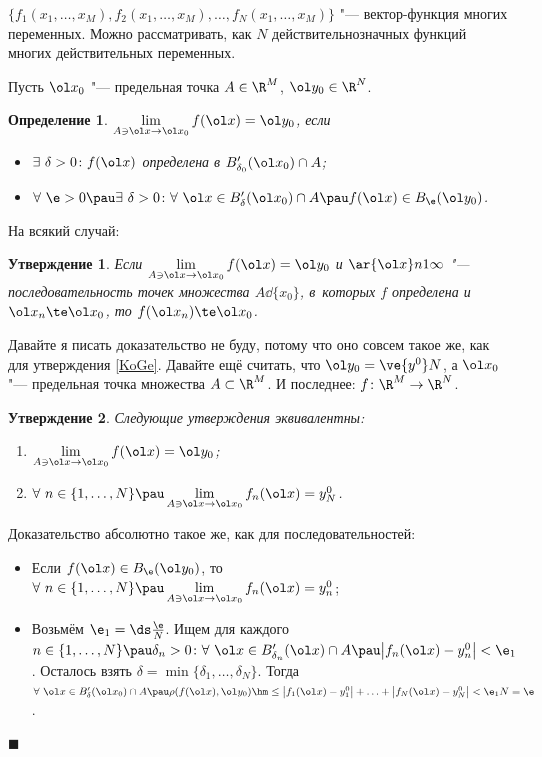 \documentclass[a4paper,10pt,twoside]{article}
\newtheorem{Def}{Определение}[section]
\newtheorem{Ut}{Утверждение}[section]
\newenvironment{Proof}
       {\par\noindent{\textbf{Доказательство.}}}
       {\hfill$\scriptstyle\blacksquare$}
\begin{document}
	 $\big\{f_1(x_1,\ldots,x_M),f_2(x_1,\ldots,x_M),\ldots,f_N(x_1,\ldots,x_M)\big\}$ "--- вектор-функция многих переменных. Можно рассматривать, как 
	 $N$ действительнозначных функций многих действительных переменных.
	 
	 Пусть $\ol x_0$ "--- предельная точка $A\in\R^M$, $\ol y_0\in\R^N$.
	 \begin{Def}
	 $\lim\limits_{A\ni\ol x\to \ol x_0}f(\ol x) = \ol y_0$, если
	 \begin{itemize}
	   \item [0)] $\exists\ \delta > 0\colon f(\ol x)$ определена в $B'_{\delta_0}(\ol x_0)\cap A$;
	   \item [1)] $\forall\ \e>0\pau \exists\ \delta >0 \colon \forall\ \ol x\in B'_\delta(\ol x_0)\cap A\pau f(\ol x)\in B_\e(\ol y_0)$.
	 \end{itemize}
	 \end{Def} 
	 На всякий случай:
	 \begin{Ut}
	 Если $\lim\limits_{A\ni \ol x\to \ol x_0}f(\ol x) = \ol y_0$ и $\ar {\ol x}n1\infty$ "--- последовательность точек множества $A\dd \{x_0\}$, в~которых
	 $f$ определена и $\ol x_n \te \ol x_0$, то $f(\ol x_n)\te \ol x_0$.
	 \end{Ut}
	 Давайте я писать доказательство не буду, потому что оно совсем такое же, как для утверждения \ref{KoGe}.
	 Давайте ещё считать, что $\ol y_0 = \ve {y^0}N$, а $\ol x_0$ "--- предельная точка множества $A\subset \R^M$. И последнее: 
	 $f\colon \R^M\to \R^N$.
	 \begin{Ut}
	 Следующие утверждения эквивалентны:
	 \begin{enumerate}
	   \item $\lim\limits_{A\ni\ol x\to\ol x_0}f(\ol x) = \ol y_0$;
	   \item $\forall \ n\in\{1,\ldots,N\}\pau \lim\limits_{A\ni \ol x\to \ol x_0}f_n(\ol x) = y_N^0$.
	 \end{enumerate}
	 \end{Ut}
	 \begin{Proof}
	 Доказательство абсолютно такое же, как для последовательностей:
	 \begin{itemize}
	   \item [$\imp$] Если $f(\ol x)\in B_\e(\ol y_0)$, то $\forall\ n\in\{1,\ldots, N\}\pau \lim\limits_{A\ni \ol x\to \ol x_0}f_n(\ol x) = y_n^0$;
	   \item [$\Leftarrow$] Возьмём $\e_1 = \ds\frac{\e}{N}$. Ищем для каждого $n\in\{1,\ldots,N\}\pau \delta_n > 0\colon
	   \forall\ \ol x\in B'_{\delta_n}(\ol x)\cap A\pau \big|f_n(\ol x) - y_n^0\big|<\e_1$. Осталось взять $\delta = \min\{\delta_1,\ldots,\delta_N\}$.
	   Тогда $\forall\ \ol x\in B'_\delta(\ol x_0)\cap A\pau \rho(f(\ol x),\ol y_0)\hm\le \big|f_1(\ol x) - y_1^0\big|+\ldots+\big|f_N(\ol x) - y_N^0\big|<\e_1N=\e$.
	 \end{itemize}
	 \end{Proof}
	 
\end{document}
